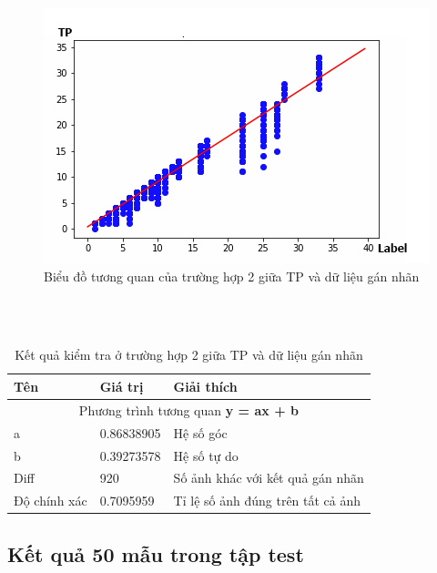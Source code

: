 \begin{center}
    \begin{figure}[H]
    \centering
    \includegraphics[width=0.9\columnwidth]{images/chap3/correlation_tp_70k.png}
    \caption{Biểu đồ tương quan của trường hợp 2 giữa TP và dữ liệu gán nhãn}
    \label{fig:my_label}
    \end{figure}
\end{center}
~\\
~\\
\begin{table}[H]
    \begin{tabular}{p{4cm}  p{2.5cm}  p{5.5cm} }   
    \hline		
	Tên & Giá trị & Giải thích \\
	\hline
	\multicolumn{3}{c}{Phương trình tương quan \textbf{y = ax + b}} \\
	a & 0.86838905 & Hệ số góc \\
	b & 0.39273578 & Hệ số tự do \\
	\hline
	Diff & 920 & Số ảnh khác với kết quả gán nhãn \\
	Độ chính xác & 0.7095959 &  Tỉ lệ số ảnh đúng trên tất cả ảnh\\
	\hline
	\end{tabular}
	\caption{Kết quả kiểm tra ở trường hợp 2 giữa TP và dữ liệu gán nhãn}
    \label{chap3:case2:table02}    
\end{table}
\subsection{Kết quả 50 mẫu trong tập test}
